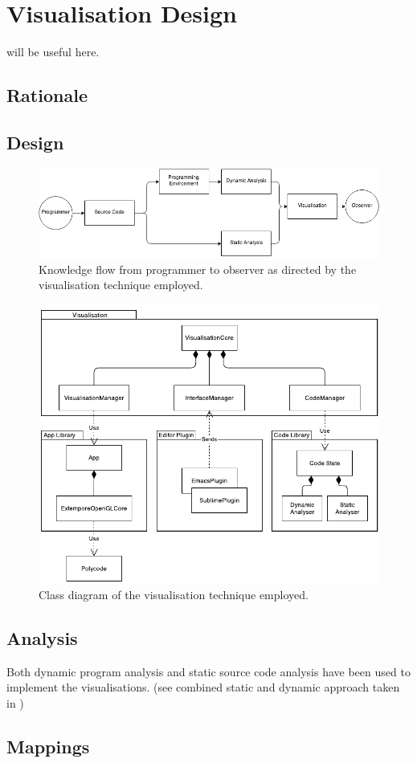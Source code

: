 
\chapter{Visualisation Design}

{\color{red}\cite{Ware2013a,McLean2010a,Purchase1996} will be useful here.}

\section{Rationale}

\section{Design}

\begin{figure}
  \centering \includegraphics[width=\columnwidth]{../images/diagrams/knowledge-flow}
  \caption{Knowledge flow from programmer to observer as directed by the visualisation technique employed.}
\label{fig:knowledge-flow}
\end{figure}

\begin{figure}
  \centering \includegraphics[width=\columnwidth]{../images/diagrams/visualisation-class-diagram}
  \caption{Class diagram of the visualisation technique employed.}
\label{fig:visualisation-class-diagram}
\end{figure}

\section{Analysis}
Both dynamic program analysis and static source code analysis have been used to implement the visualisations. (see combined static and dynamic approach taken in \cite{Eisenbarth2003})

\section{Mappings}